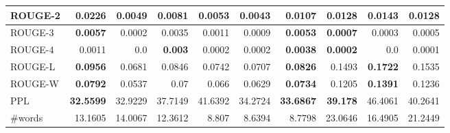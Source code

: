 \begin{table}[htb]
\begin{tabular}{|l|r|r|r|r|r|r|r|r|r|}
        ROUGE{-}2 & \textbf{0.0226} & 0.0049 & 0.0081 & 0.0053 & 0.0043 & \textbf{0.0107} & 0.0128 & \textbf{0.0143} & 0.0128\\\hline
        ROUGE{-}3 & \textbf{0.0057} & 0.0002 & 0.0035 & 0.0011 & 0.0009 & \textbf{0.0053} & \textbf{0.0007} & 0.0003 & 0.0005\\\hline
        ROUGE{-}4 & 0.0011 & 0.0 & \textbf{0.003} & 0.0002 & 0.0002 & \textbf{0.0038} & \textbf{0.0002} & 0.0 & 0.0001\\\hline
        ROUGE{-}L & \textbf{0.0956} & 0.0681 & 0.0846 & 0.0742 & 0.0707 & \textbf{0.0826} & 0.1493 & \textbf{0.1722} & 0.1535\\\hline
        ROUGE{-}W & \textbf{0.0792} & 0.0537 & 0.07 & 0.066 & 0.0629 & \textbf{0.0734} & 0.1205 & \textbf{0.1391} & 0.1236\\\hline
        PPL & \textbf{32.5599} & 32.9229 & 37.7149 & 41.6392 & 34.2724 & \textbf{33.6867} & \textbf{39.178} & 46.4061 & 40.2641\\\hline
        \#words & 13.1605 & 14.0067 & 12.3612 & 8.807 & 8.6394 & 8.7798 & 23.0646 & 16.4905 & 21.2449\\
        \hline
    \end{tabular}
\end{table}
